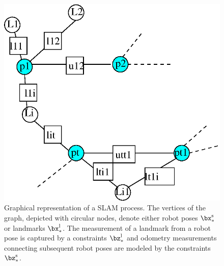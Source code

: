 \documentclass[a4paper]{article}
\begin{document}
\begin{figure}
\centering
\includegraphics[width=0.8\columnwidth]{pics/slam.eps}
\caption{Graphical representation of a SLAM process. The vertices of
  the graph, depicted with circular nodes, denote either robot poses
  $\bx^\mathrm{s}_*$ or landmarks $\bx^\mathrm{l}_*$. The measurement
  of a landmark from a robot pose is captured by a constraints
  $\bz^{\mathrm{l}}_*$ and odometry measurements connecting subsequent
robot poses are modeled by the constraints $\bz^\mathrm{s}_*$.}
\label{fig:slam}
\end{figure}
\end{document}
